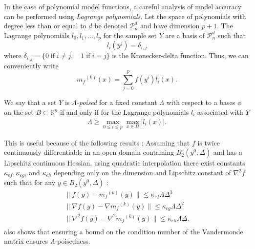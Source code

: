 \documentclass{article}
\theoremstyle{case}
\newcommand{\modelk}{{{m}_f}^{(k)}}
\newcommand{\polydn}{\mathcal{P}^d_n}
\begin{document}
In the case of polynomial model functions, a careful analysis of model accuracy can be performed using \emph{Lagrange polynomials}.
Let the space of polynomials with degree less than or equal to $d$ be denoted $\polydn$ and have dimension $p+1$.
The Lagrange polynomials $l_0, l_1, \ldots, l_p$ for the sample set $Y$ are a basis of $\polydn$ such that
\[
l_i(y^j) = \delta_{i,j}
\]
where $\delta_{i,j} = \{0 \;\text{if}\; i\ne j,\quad 1 \;\text{if} \; i = j \}$ is the Kronecker-delta function.
Thus, we can conveniently write
\[
\label{reg}
\modelk(x) = \sum^p_{j=0}f(y^i)l_i(x).
\]

We say that a set $Y$ is \emph{$\Lambda$-poised} for a fixed constant $\Lambda$ with respect to a bases $\phi$ on the set 
$B \subset \mathbb R^n$ if and only if for the Lagrange polynomials $l_i$ associated with $Y$
\begin{align}
\Lambda \ge \max_{0\le i\le p}\max_{x\in B}|l_i(x)|.
\end{align}


This is useful because of the following results \cite{DUMMY:intro_book}:
Assuming that $f$ is twice continuously differentiable in an open domain containing $B_2(y^0, \Delta)$ and has a Lipschitz continuous Hessian, using quadratic interpolation there exist constants $\kappa_{ef}, \kappa_{eg}$, and $\kappa_{eh}$ depending only on the dimension and Lipschitz constant of $\nabla^2 f$ such that for any $y \in B_2(y^0, \Delta)$ :
\begin{align}
 \label{fully_quadratic}
 \|f(y) - \modelk(y)\| \le \kappa_{ef} \Lambda \Delta^3 \\
 \|\nabla f(y) - \nabla \modelk(y)\| \le \kappa_{eg} \Lambda \Delta^2 \\
 \|\nabla^2 f(y) - \nabla^2 \modelk(y)\| \le \kappa_{eh}\Lambda \Delta .\\
\end{align}
\cite{DUMMY:intro_book} also shows that ensuring a bound on the condition number of the Vandermonde matrix ensures $\Lambda$-poisedness.
\end{document}

